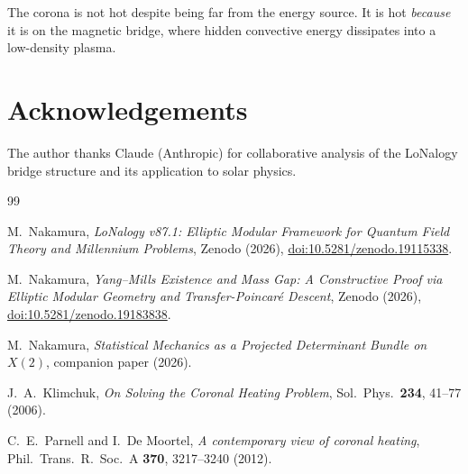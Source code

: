 \documentclass[12pt]{article}
\theoremstyle{plain}
\theoremstyle{definition}
\numberwithin{equation}{section}
\begin{document}
The corona is not hot despite being far from the energy source.
It is hot \emph{because} it is on the magnetic bridge, where
hidden convective energy dissipates into a low-density plasma.


\section*{Acknowledgements}

The author thanks Claude (Anthropic) for collaborative analysis
of the LoNalogy bridge structure and its application to solar
physics.


\begin{thebibliography}{99}

M.~Nakamura,
\textit{LoNalogy v87.1: Elliptic Modular Framework for Quantum
Field Theory and Millennium Problems},
Zenodo (2026),
\href{https://doi.org/10.5281/zenodo.19115338}{doi:10.5281/zenodo.19115338}.

M.~Nakamura,
\textit{Yang--Mills Existence and Mass Gap: A Constructive Proof
via Elliptic Modular Geometry and Transfer-Poincar\'e Descent},
Zenodo (2026),
\href{https://doi.org/10.5281/zenodo.19183838}{doi:10.5281/zenodo.19183838}.

M.~Nakamura,
\textit{Statistical Mechanics as a Projected Determinant Bundle
on $X(2)$},
companion paper (2026).

J.~A.~Klimchuk,
\textit{On Solving the Coronal Heating Problem},
Sol.\ Phys.\ \textbf{234}, 41--77 (2006).

C.~E.~Parnell and I.~De Moortel,
\textit{A contemporary view of coronal heating},
Phil.\ Trans.\ R.\ Soc.\ A \textbf{370}, 3217--3240 (2012).

\end{thebibliography}
\end{document}
